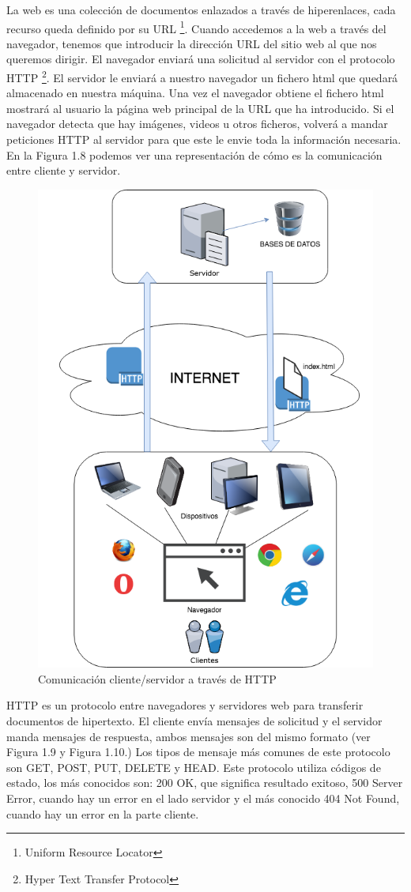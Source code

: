 La web es una colección de documentos enlazados a través de hiperenlaces, cada recurso queda definido por su URL \footnote{Uniform Resource Locator}. Cuando accedemos a la web a través del navegador, tenemos que introducir la dirección URL del sitio web al que nos queremos dirigir. El navegador enviará una solicitud al servidor con el protocolo HTTP \footnote{Hyper Text Transfer Protocol}. El servidor le enviará a nuestro navegador un fichero html que quedará almacenado en nuestra máquina. Una vez el navegador obtiene el fichero html mostrará al usuario la página web principal de la URL que ha introducido. Si el navegador detecta que hay imágenes, videos u otros ficheros, volverá a mandar peticiones HTTP al servidor para que este le envie toda la información necesaria. En la Figura 1.8 podemos ver una representación de cómo es la comunicación entre cliente y servidor.
\begin{figure}[H]
    \centering
    \includegraphics[width=0.45\columnwidth]{chapters/images/web.png}
    \caption{Comunicación cliente/servidor a través de HTTP}
    \label{fig:httpprotocol}
\end{figure}
 HTTP es un protocolo entre navegadores y servidores web para transferir documentos de hipertexto. El cliente envía mensajes de solicitud y el servidor manda mensajes de respuesta, ambos mensajes son del mismo formato (ver Figura 1.9 y Figura 1.10.) Los tipos de mensaje más comunes de este protocolo son GET, POST, PUT, DELETE y HEAD. Este protocolo utiliza códigos de estado, los más conocidos son: 200 OK, que significa resultado exitoso, 500 Server Error, cuando hay un error en el lado servidor y el más conocido 404 Not Found, cuando hay un error en la parte cliente. \cite{tecnologiasweb}

